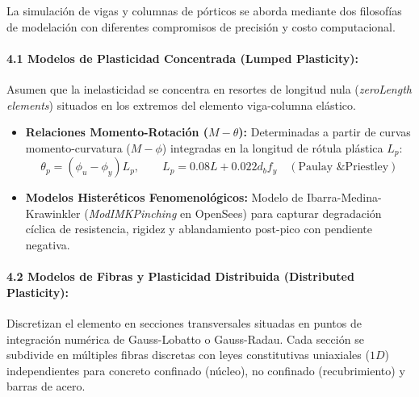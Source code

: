 \documentclass[11pt,letterpaper]{article}
\begin{document}
\begin{modulebox}
La simulación de vigas y columnas de pórticos se aborda mediante dos filosofías de modelación con diferentes compromisos de precisión y costo computacional.

\paragraph{4.1 Modelos de Plasticidad Concentrada (Lumped Plasticity):}
Asumen que la inelasticidad se concentra en resortes de longitud nula (\textit{zeroLength elements}) situados en los extremos del elemento viga-columna elástico.
\begin{itemize}
    \item \textbf{Relaciones Momento-Rotación ($M-\theta$):} Determinadas a partir de curvas momento-curvatura ($M-\phi$) integradas en la longitud de rótula plástica $L_p$:
    \begin{equation}
        \theta_p = (\phi_u - \phi_y) L_p, \qquad L_p = 0.08 L + 0.022 d_b f_y \quad (\text{Paulay \& Priestley})
    \end{equation}
    \item \textbf{Modelos Histeréticos Fenomenológicos:} Modelo de Ibarra-Medina-Krawinkler (\textit{ModIMKPinching} en OpenSees) para capturar degradación cíclica de resistencia, rigidez y ablandamiento post-pico con pendiente negativa.
\end{itemize}

\paragraph{4.2 Modelos de Fibras y Plasticidad Distribuida (Distributed Plasticity):}
Discretizan el elemento en secciones transversales situadas en puntos de integración numérica de Gauss-Lobatto o Gauss-Radau. Cada sección se subdivide en múltiples fibras discretas con leyes constitutivas uniaxiales ($1D$) independientes para concreto confinado (núcleo), no confinado (recubrimiento) y barras de acero.


\end{modulebox}
\end{document}
